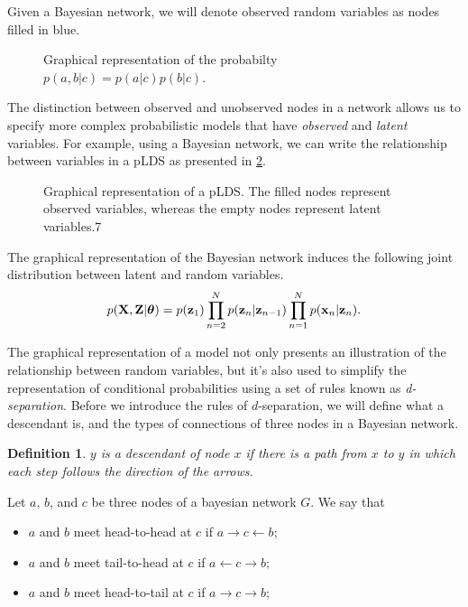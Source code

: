\documentclass[11pt]{article}
\numberwithin{equation}{section}
\newcommand{\x}{{\bf x}}
\newcommand{\z}{{\bf z}}
\newtheorem{definition}{Definition}[section]
\begin{document}
Given a Bayesian network, we will denote observed random variables as nodes filled in blue. 

\begin{figure}[h!]
	\centering
	
	\caption{Graphical representation of the probabilty $p(a, b\vert c) = p(a \vert c) p(b \vert c)$.}
	\label{fig:lds-gm}
\end{figure}


The distinction between observed and unobserved nodes in a network allows us to specify more complex probabilistic models that have \textit{observed} and \textit{latent} variables. For example, using a Bayesian network, we can write the relationship between variables in a pLDS as presented in \ref{fig:lds-gm}.

\begin{figure}[h!]
	\centering
	
	\caption{Graphical representation of a pLDS. The filled nodes represent observed variables, whereas the empty nodes represent latent variables.7}
	\label{fig:lds-gm}
\end{figure}

The graphical representation of the Bayesian network induces the following joint distribution between latent and random variables.
\begin{equation}
	p({\bf X}, {\bf Z} \vert\boldsymbol\theta) = p(\z_1)\prod_{n=2}^N p(\z_n\vert \z_{n-1})\prod_{n=1}^N p(\x_n\vert \z_n).
\end{equation}

The graphical representation of a model not only presents an illustration of the relationship between random variables, but it's also used to simplify the representation of conditional probabilities using a set of rules known as \textit{d-separation}. Before we introduce the rules of $d$-separation, we will define what a descendant is, and the types of connections of three nodes in a Bayesian network.

\begin{definition}
	$y$ is a descendant of node $x$ if there is a path from $x$ to $y$ in which each step follows the direction of the arrows.
\end{definition}

Let $a$, $b$, and $c$ be three nodes of a bayesian network $G$. We say that
\begin{itemize}
	\item $a$ and $b$ meet head-to-head at $c$ if $a \rightarrow c \leftarrow b $;
	\item $a$ and $b$ meet tail-to-head at $c$ if $a \leftarrow c \rightarrow b $;
	\item $a$ and $b$ meet head-to-tail at $c$ if $a \rightarrow c \rightarrow b $;
\end{itemize}
\end{document}
